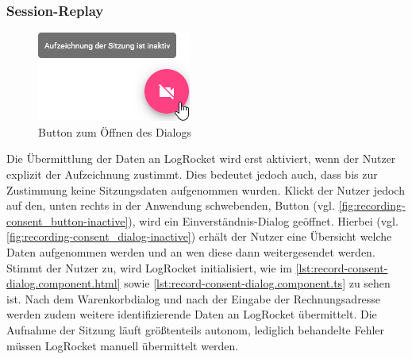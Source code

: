 

\pagebreak



\subsubsection{Session-Replay}

\begin{figure}
\centering
\includegraphics[width=\linewidth]{img/04_erstellung-poc/implementierung_frontend_recording-consent_button-inactive.png}
\caption{Button zum Öffnen des Dialogs}
\label{fig:recording-consent_button-inactive}
\end{figure}

Die Übermittlung der Daten an LogRocket wird erst aktiviert, wenn der Nutzer explizit der Aufzeichnung zustimmt. Dies bedeutet jedoch auch, dass bis zur Zustimmung keine Sitzungsdaten aufgenommen wurden. Klickt der Nutzer jedoch auf den, unten rechts in der Anwendung schwebenden, Button (vgl. \autoref{fig:recording-consent_button-inactive}), wird ein Einverständnis-Dialog geöffnet. Hierbei (vgl. \autoref{fig:recording-consent_dialog-inactive}) erhält der Nutzer eine Übersicht welche Daten aufgenommen werden und an wen diese dann weitergesendet werden. Stimmt der Nutzer zu, wird LogRocket initialisiert, wie im \autoref{lst:record-consent-dialog.component.html} sowie \autoref{lst:record-consent-dialog.component.ts} zu sehen ist. Nach dem Warenkorbdialog und nach der Eingabe der Rechnungsadresse werden zudem weitere identifizierende Daten an LogRocket übermittelt. Die Aufnahme der Sitzung läuft größtenteils autonom, lediglich behandelte Fehler müssen LogRocket manuell übermittelt werden.
	
